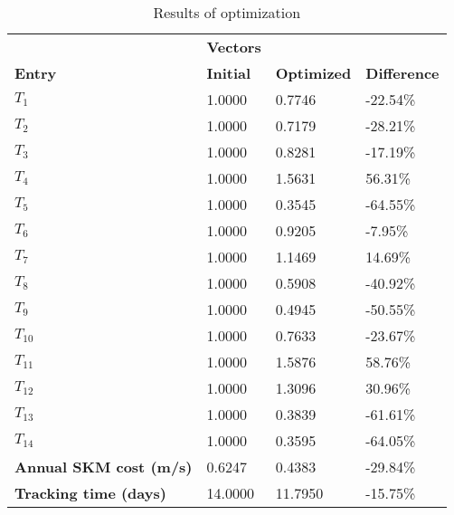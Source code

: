 \begin{table}[H]
\centering
\begin{tabular}{llll}
\textbf{}      & \cellcolor[HTML]{EFEFEF}\textbf{Vectors} & \textbf{} & \textbf{}         \\
\rowcolor[HTML]{EFEFEF} 
\textbf{Entry} & \textbf{Initial} & \textbf{Optimized} & \textbf{Difference} \\
$T_1$ & 1.0000 & 0.7746 & -22.54\% \\ 
$T_2$ & 1.0000 & 0.7179 & -28.21\% \\ 
$T_3$ & 1.0000 & 0.8281 & -17.19\% \\ 
$T_4$ & 1.0000 & 1.5631 & 56.31\% \\ 
$T_5$ & 1.0000 & 0.3545 & -64.55\% \\ 
$T_6$ & 1.0000 & 0.9205 & -7.95\% \\ 
$T_7$ & 1.0000 & 1.1469 & 14.69\% \\ 
$T_8$ & 1.0000 & 0.5908 & -40.92\% \\ 
$T_9$ & 1.0000 & 0.4945 & -50.55\% \\ 
$T_10$ & 1.0000 & 0.7633 & -23.67\% \\ 
$T_11$ & 1.0000 & 1.5876 & 58.76\% \\ 
$T_12$ & 1.0000 & 1.3096 & 30.96\% \\ 
$T_13$ & 1.0000 & 0.3839 & -61.61\% \\ 
$T_14$ & 1.0000 & 0.3595 & -64.05\% \\ 
\rowcolor[HTML]{EFEFEF} 
\textbf{Annual SKM cost (m/s)}  & 0.6247 & 0.4383 & -29.84\% \\ 
\rowcolor[HTML]{EFEFEF} 
\textbf{Tracking time (days)}  & 14.0000 & 11.7950 & -15.75\% \\ 
\end{tabular}
\caption{Results of optimization}
\label{tab:OptimizationAnalysis}
\end{table}